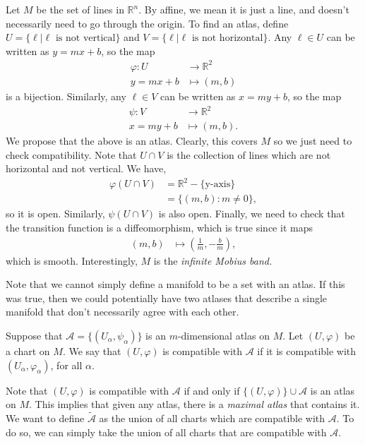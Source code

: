 \documentclass{article}
\numberwithin{equation}{section}
\begin{document}
\begin{example}
    Let $M$ be the set of  lines in $\mathbb{R}^n$. By affine, we mean it is just a line, and doesn't necessarily need to go through the origin. To find an atlas, define $U = \{\ell | \ell \text{ is not vertical}\}$ and $V=\{\ell | \ell \text{ is not horizontal}\}$. Any $\ell \in U$ can be written as $y=mx+b$, so the map 
    \begin{align*}
        \varphi: U &\rightarrow \mathbb{R}^2 \\ 
        y=mx+b &\mapsto (m,b)
    \end{align*}
    is a bijection. Similarly, any $\ell \in V$ can be written as $x=my+b$, so the map
    \begin{align*}
        \psi: V &\rightarrow \mathbb{R}^2 \\ 
        x=my+b &\mapsto (m,b).
    \end{align*}
    We propose that the above is an atlas. Clearly, this covers $M$ so we just need to check compatibility. Note that $U\cap V$ is the collection of lines which are not horizontal and not vertical. We have,
    \begin{align*}
        \varphi(U \cap V) &= \mathbb{R}^2 - \{\text{y-axis}\} \\ 
        &= \{(m,b): m \neq 0\},
    \end{align*}
    so it is open. Similarly, $\psi(U\cap V)$ is also open. Finally, we need to check that the transition function is a diffeomorphism, which is true since it maps
    \begin{align*}
        (m,b) &\mapsto \left(\frac{1}{m}, -\frac{b}{m}\right),
    \end{align*}
    which is smooth. Interestingly, $M$ is the \textit{infinite Mobius band.}
\end{example}
Note that we cannot simply define a manifold to be a set with an atlas. If this was true, then we could potentially have two atlases that describe a single manifold that don't necessarily agree with each other.
\begin{definition}
    Suppose that $\mathcal{A} = \{(U_\alpha, \psi_\alpha)\}$ is an $m$-dimensional atlas on $M$. Let $(U,\varphi)$ be a chart on $M$. We say that $(U,\varphi)$ is compatible with $\mathcal{A}$ if it is compatible with $(U_\alpha,\varphi_\alpha)$, for all $\alpha$.
\end{definition}
Note that $(U,\varphi)$ is compatible with $\mathcal{A}$ if and only if $\{(U,\varphi)\} \cup \mathcal{A}$ is an atlas on $M$. This implies that given any atlas, there is a \textit{maximal atlas} that contains it. We want to define $\tilde{\mathcal{A}}$ as the union of all charts which are compatible with $\mathcal{A}$. To do so, we can simply take the union of all charts that are compatible with $\mathcal{A}$. 
\end{document}

